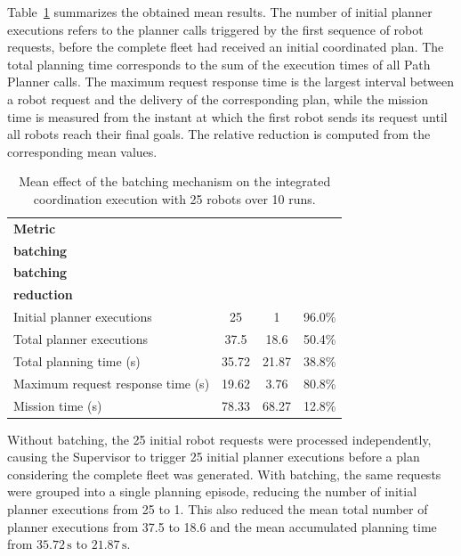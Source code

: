 Table~\ref{tab:batching_results} summarizes the obtained mean results. The number of initial
planner executions refers to the planner calls triggered by the first sequence of robot requests,
before the complete fleet had received an initial coordinated plan. The total planning time
corresponds to the sum of the execution times of all Path Planner calls. The maximum request
response time is the largest interval between a robot request and the delivery of the corresponding
plan, while the mission time is measured from the instant at which the first robot sends its request
until all robots reach their final goals. The relative reduction is computed from the corresponding
mean values.

\begin{table}[H]
\centering
\caption{Mean effect of the batching mechanism on the integrated coordination execution with 25 robots over 10 runs.}
\label{tab:batching_results}
\scriptsize
\setlength{\tabcolsep}{4pt}
\begin{tabular}{@{}lccc@{}}
\toprule
\textbf{Metric} &
\makecell{\textbf{Without}\\\textbf{batching}} &
\makecell{\textbf{With}\\\textbf{batching}} &
\makecell{\textbf{Relative}\\\textbf{reduction}} \\
\midrule
Initial planner executions        & 25    & 1     & 96.0\% \\
Total planner executions          & 37.5  & 18.6  & 50.4\% \\
Total planning time (s)           & 35.72 & 21.87 & 38.8\% \\
Maximum request response time (s) & 19.62 & 3.76  & 80.8\% \\
Mission time (s)                  & 78.33 & 68.27 & 12.8\% \\
\bottomrule
\end{tabular}
\end{table}

Without batching, the 25 initial robot requests were processed independently, causing the
Supervisor to trigger 25 initial planner executions before a plan considering the complete fleet was
generated. With batching, the same requests were grouped into a single planning episode, reducing
the number of initial planner executions from 25 to 1. This also reduced the mean total number of
planner executions from 37.5 to 18.6 and the mean accumulated planning time from
\(35.72\,\mathrm{s}\) to \(21.87\,\mathrm{s}\).

